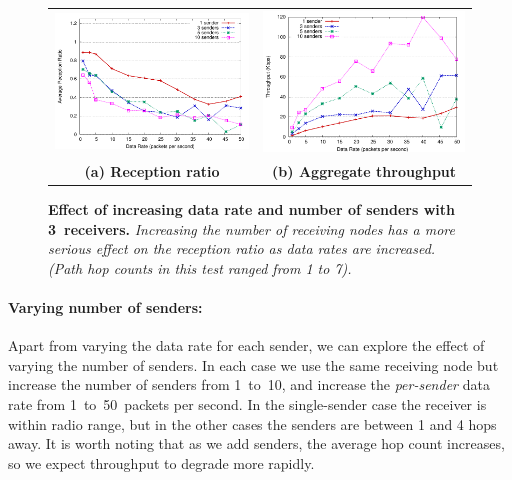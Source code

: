\begin{figure}[t]
\begin{center}
\begin{tabular}{cc}
\includegraphics[width=0.45\hsize]{./resources/codeblue-nsdi06/figures/eval/warmup/varyNumSenders3.pdf}
& 
\includegraphics[width=0.45\hsize]{./resources/codeblue-nsdi06/figures/eval/warmup/throughput3recv.pdf}
\\
{\small\bf (a) Reception ratio} & {\small\bf (b) Aggregate throughput}\\
\end{tabular}
\end{center}
\caption{\small {\bf Effect of increasing data rate and number of
senders with 3~receivers.} {\em Increasing the number of receiving nodes
has a more serious effect on the reception ratio as data rates are
increased. (Path hop counts in this test ranged from 1 to 7).}}
\label{fig-eval-varyNumSenders3}
\end{figure}

\paragraph*{Varying number of senders:}
Apart from varying the data rate for each sender, we can explore the
effect of varying the number of senders. In each case we use the same
receiving node but increase the number of senders from 1~to~10, and
increase the {\em per-sender} data rate from 1~to~50~packets per
second. In the single-sender case the receiver is within radio range,
but in the other cases the senders are between 1 and 4 hops away. It
is worth noting that as we add senders, the average hop count
increases, so we expect throughput to degrade more rapidly.

